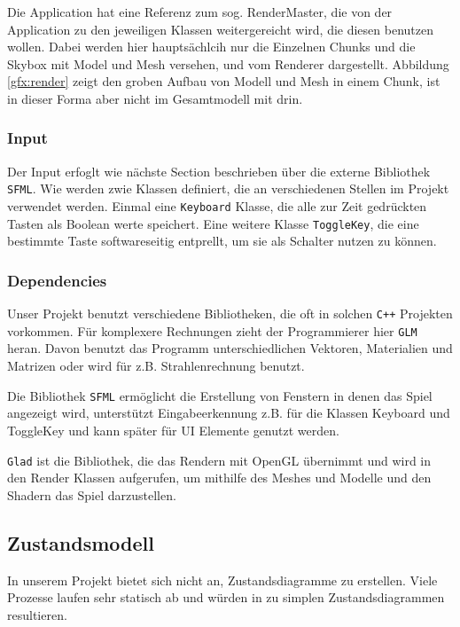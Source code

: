 \documentclass{article}
\begin{document}
Die Application hat eine Referenz zum sog. RenderMaster, die von der Application zu den jeweiligen Klassen weitergereicht wird, die diesen benutzen wollen. Dabei werden hier hauptsächlcih nur die Einzelnen Chunks und die Skybox mit Model und Mesh versehen, und vom Renderer dargestellt. Abbildung \ref{gfx:render} zeigt den groben Aufbau von Modell und Mesh in einem Chunk, ist in dieser Forma aber nicht im Gesamtmodell mit drin.

\subsubsection*{Input}

Der Input erfoglt wie nächste Section beschrieben über die externe Bibliothek \texttt{SFML}. Wie werden zwie Klassen definiert, die an verschiedenen Stellen im Projekt verwendet werden. Einmal eine \texttt{Keyboard} Klasse, die alle zur Zeit gedrückten Tasten als Boolean werte speichert. Eine weitere Klasse \texttt{ToggleKey}, die eine bestimmte Taste softwareseitig entprellt, um sie als Schalter nutzen zu können.

\subsubsection*{Dependencies}

Unser Projekt benutzt verschiedene Bibliotheken, die oft in solchen \texttt{C++} Projekten vorkommen. Für komplexere Rechnungen zieht der Programmierer hier \texttt{GLM} heran. Davon benutzt das Programm unterschiedlichen Vektoren, Materialien und Matrizen oder wird für z.B. Strahlenrechnung benutzt.

Die Bibliothek \texttt{SFML} ermöglicht die Erstellung von Fenstern in denen das Spiel angezeigt wird, unterstützt Eingabeerkennung z.B. für die Klassen Keyboard und ToggleKey und kann später für UI Elemente genutzt werden.

\texttt{Glad} ist die Bibliothek, die das Rendern mit OpenGL übernimmt und wird in den Render Klassen aufgerufen, um mithilfe des Meshes und Modelle und den Shadern das Spiel darzustellen.

\subsection{Zustandsmodell} \label{subsec:statemodel}

In unserem Projekt bietet sich nicht an, Zustandsdiagramme zu erstellen. Viele Prozesse laufen sehr statisch ab und würden in zu simplen Zustandsdiagrammen resultieren.
\end{document}
